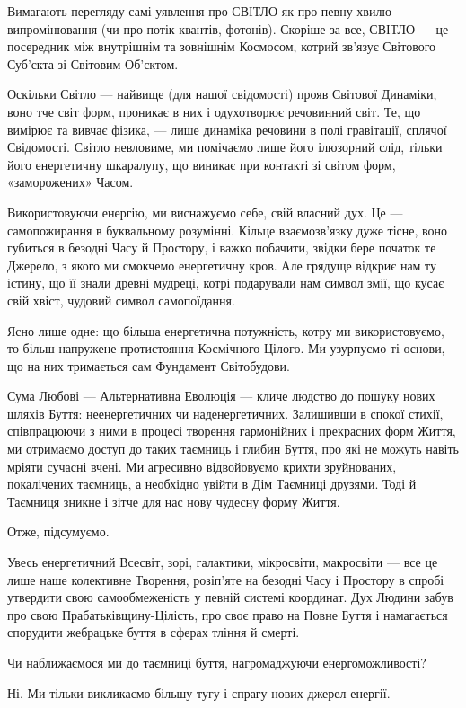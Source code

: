 Вимагають перегляду самі уявлення про СВІТЛО як про певну хвилю випромінювання
(чи про потік квантів, фотонів). Скоріше за все, СВІТЛО — це посередник між
внутрішнім та зовнішнім Космосом, котрий зв’язує Світового Суб’єкта зі Світовим
Об’єктом.

Оскільки Світло — найвище (для нашої свідомості) прояв Світової Динаміки, воно
тче світ форм, проникає в них і одухотворює речовинний світ. Те, що вимірює та
вивчає фізика, — лише динаміка речовини в полі гравітації, сплячої Свідомості.
Світло невловиме, ми помічаємо лише його ілюзорний слід, тільки його
енергетичну шкаралупу, що виникає при контакті зі світом форм, «заморожених»
Часом.

Використовуючи енергію, ми виснажуємо себе, свій власний дух. Це —
самопожирання в буквальному розумінні. Кільце взаємозв’язку дуже тісне, воно
губиться в безодні Часу й Простору, і важко побачити, звідки бере початок те
Джерело, з якого ми смокчемо енергетичну кров. Але грядуще відкриє нам ту
істину, що її знали древні мудреці, котрі подарували нам символ змії, що кусає
свій хвіст, чудовий символ самопоїдання.

Ясно лише одне: що більша енергетична потужність, котру ми використовуємо, то
більш напружене протистояння Космічного Цілого. Ми узурпуємо ті основи, що на
них тримається сам Фундамент Світобудови.

Сума Любові — Альтернативна Еволюція — кличе людство до пошуку нових шляхів
Буття: неенергетичних чи наденергетичних. Залишивши в спокої стихії,
співпрацюючи з ними в процесі творення гармонійних і прекрасних форм Життя, ми
отримаємо доступ до таких таємниць і глибин Буття, про які не можуть навіть
мріяти сучасні вчені. Ми агресивно відвойовуємо крихти зруйнованих, покалічених
таємниць, а необхідно увійти в Дім Таємниці друзями. Тоді й Таємниця зникне і
зітче для нас нову чудесну форму Життя.

Отже, підсумуємо.

Увесь енергетичний Всесвіт, зорі, галактики, мікросвіти, макросвіти — все це
лише наше колективне Творення, розіп’яте на безодні Часу і Простору в спробі
утвердити свою самообмеженість у певній системі координат. Дух Людини забув про
свою Прабатьківщину-Цілість, про своє право на Повне Буття і намагається
спорудити жебрацьке буття в сферах тління й смерті.

Чи наближаємося ми до таємниці буття, нагромаджуючи енергоможливості?

Ні. Ми тільки викликаємо більшу тугу і спрагу нових джерел енергії.

